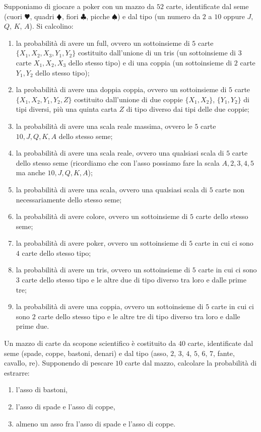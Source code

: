 Supponiamo di giocare a poker con un mazzo da $52$ carte, identificate dal seme (cuori $\varheartsuit $, quadri $\vardiamondsuit $, fiori $\clubsuit $, picche $\spadesuit $) e dal tipo (un numero da $2$ a $10$ oppure $J$, $Q$, $K$, $A$). Si calcolino:
\begin{enumerate}
	\item la probabilità di avere un full, ovvero un sottoinsieme di $5$ carte $\{X_{1} ,X_{2} ,X_{3} ,Y_{1} ,Y_{2}\}$ costituito dall'unione di un tris (un sottoinsieme di $3$ carte $X_{1} ,X_{2} ,X_{3}$ dello stesso tipo) e di una coppia (un sottoinsieme di $2$ carte $Y_{1} ,Y_{2}$ dello stesso tipo);
	\item la probabilità di avere una doppia coppia, ovvero un sottoinsieme di $5$ carte $\{X_{1} ,X_{2} ,Y_{1} ,Y_{2} ,Z\}$ costituito dall'unione di due coppie $\{X_{1} ,X_{2}\}$, $\{Y_{1} ,Y_{2}\}$ di tipi diversi, più una quinta carta $Z$ di tipo diverso dai tipi delle due coppie;
	\item la probabilità di avere una scala reale massima, ovvero le $5$ carte $10,J,Q,K,A$ dello stesso seme;
	\item la probabilità di avere una scala reale, ovvero una qualsiasi scala di $5$ carte dello stesso seme (ricordiamo che con l'asso possiamo fare la scala $A,2,3,4,5$ ma anche $10,J,Q,K,A$);
	\item la probabilità di avere una scala, ovvero una qualsiasi scala di $5$ carte non necessariamente dello stesso seme;
	\item la probabilità di avere colore, ovvero un sottoinsieme di $5$ carte dello stesso seme;
	\item la probabilità di avere poker, ovvero un sottoinsieme di $5$ carte in cui ci sono $4$ carte dello stesso tipo;
	\item la probabilità di avere un tris, ovvero un sottoinsieme di $5$ carte in cui ci sono $3$ carte dello stesso tipo e le altre due di tipo diverso tra loro e dalle prime tre;
	\item la probabilità di avere una coppia, ovvero un sottoinsieme di $5$ carte in cui ci sono $2$ carte dello stesso tipo e le altre tre di tipo diverso tra loro e dalle prime due.
\end{enumerate}

\Esercizio{}

Un mazzo di carte da scopone scientifico è costituito da $40$ carte, identificate dal seme (spade, coppe, bastoni, denari) e dal tipo (asso, $2$, $3$, $4$, $5$, $6$, $7$, fante, cavallo, re). Supponendo di pescare $10$ carte dal mazzo, calcolare la probabilità di estrarre:
\begin{enumerate}
	\item l'asso di bastoni,
	\item l'asso di spade e l'asso di coppe,
	\item almeno un asso fra l'asso di spade e l'asso di coppe.
\end{enumerate}

